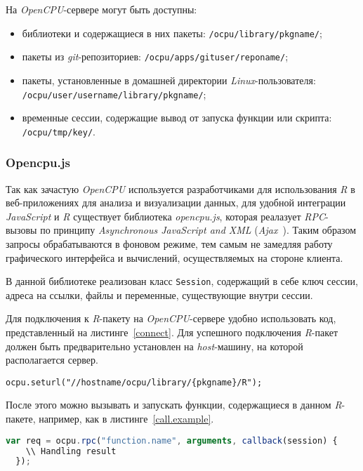 \documentclass[annotation,specification]{itmo-student-thesis}
\begin{document}
На \emph{OpenCPU}-сервере могут быть доступны:
\begin{itemize}
\item библиотеки и содержащиеся в них пакеты: \texttt{/ocpu/library/{pkgname}/};
\item пакеты из \emph{git}-репозиториев: \texttt{/ocpu/apps/{gituser}/{reponame}/};
\item пакеты, установленные в домашней директории \emph{Linux}-пользователя: \texttt{/ocpu/user/{username}/library/{pkgname}/};
\item временные сессии, содержащие вывод от запуска функции или скрипта: \texttt{/ocpu/tmp/{key}/}.
\end{itemize}

\subsubsection{Opencpu.js}
Так как зачастую \emph{OpenCPU} используется разработчиками для использования \emph{R} в веб-приложениях для анализа и визуализации данных, для удобной интеграции \emph{JavaScript} и \emph{R} существует библиотека \textit{opencpu.js}, которая реалазует \emph{RPC}-вызовы по принципу \emph{Asynchronous JavaScript and XML} (\emph{Ajax}~\cite{ajax}). Таким образом запросы обрабатываются в фоновом режиме, тем самым не замедляя работу графического интерфейса и вычислений, осуществляемых на стороне клиента.

В данной библиотеке реализован класс \texttt{Session}, содержащий в себе ключ сессии, адреса на ссылки, файлы и переменные, существующие внутри сессии.

Для подключения к \emph{R}-пакету на \emph{OpenCPU}-сервере удобно использовать код, представленный на листинге~\ref{connect}. Для успешного подключения \emph{R}-пакет должен быть предварительно установлен на \emph{host}-машину, на которой располагается сервер. 

\begin{lstlisting}[float=!h,caption={Подключение к \emph{R}-пакету},label={connect}]
  ocpu.seturl("//hostname/ocpu/library/{pkgname}/R");
\end{lstlisting}
После этого можно вызывать и запускать функции, содержащиеся в данном \emph{R}-пакете, например, как в листинге~\ref{call.example}.

\begin{lstlisting}[float=!h,caption={Шаблон вызова \emph{R}-функции из \emph{JavaScript}},label={call.example},language=JavaScript]
  var req = ocpu.rpc("function.name", arguments, callback(session) {
    \\ Handling result
  });
\end{lstlisting}
\end{document}
